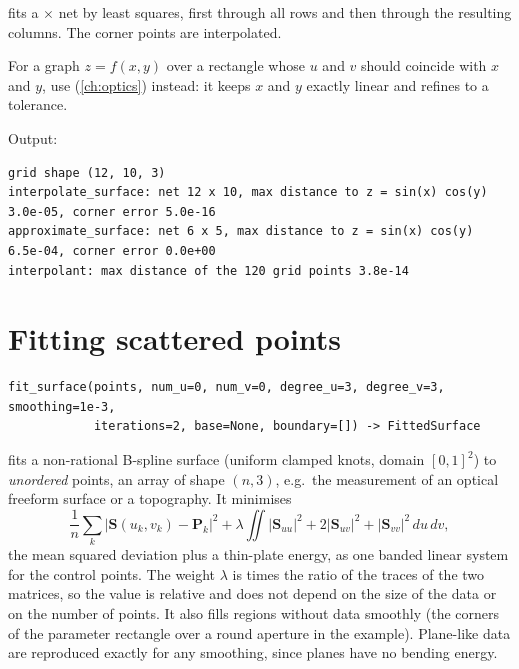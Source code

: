  fits a  $\times$  net by least squares,
first through all rows and then through the resulting columns. The corner points are
interpolated.

For a graph $z = f(x,y)$ over a rectangle whose $u$ and $v$ should coincide with $x$ and $y$, use
 (\cref{ch:optics}) instead: it keeps $x$ and $y$ exactly linear and
refines to a tolerance.


Output:

\begin{lstlisting}[style=text]
grid shape (12, 10, 3)
interpolate_surface: net 12 x 10, max distance to z = sin(x) cos(y) 3.0e-05, corner error 5.0e-16
approximate_surface: net 6 x 5, max distance to z = sin(x) cos(y) 6.5e-04, corner error 0.0e+00
interpolant: max distance of the 120 grid points 3.8e-14
\end{lstlisting}

\section{Fitting scattered points}\label{sec:scattered-fitting}

\begin{lstlisting}[style=text]
fit_surface(points, num_u=0, num_v=0, degree_u=3, degree_v=3, smoothing=1e-3,
            iterations=2, base=None, boundary=[]) -> FittedSurface
\end{lstlisting}

 fits a non-rational B-spline surface (uniform clamped knots, domain
$[0,1]^2$) to \emph{unordered} points, an array of shape $(n, 3)$, e.g.\ the measurement of an
optical freeform surface or a topography. It minimises
\[
  \frac1n\sum_k \bigl|\mathbf S(u_k, v_k) - \mathbf P_k\bigr|^2
  + \lambda \iint |\mathbf S_{uu}|^2 + 2|\mathbf S_{uv}|^2 + |\mathbf S_{vv}|^2 \,du\,dv ,
\]
the mean squared deviation plus a thin-plate energy, as one banded linear system for the
control points. The weight $\lambda$ is  times the ratio of the traces of the
two matrices, so the value is relative and does not depend on the size of the data or on the
number of points. It also fills regions without data smoothly (the corners of the parameter
rectangle over a round aperture in the example). Plane-like data are reproduced exactly for
any smoothing, since planes have no bending energy.

